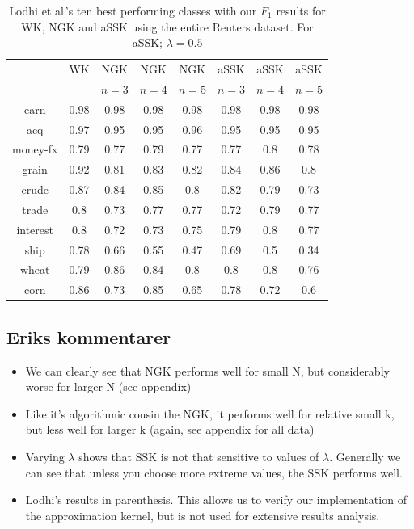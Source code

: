 \begin{table}
	\centering	
	\begin{tabular}{| c | c | c | c | c | c | c | c |}\hline
		& WK & NGK & NGK  & NGK  & aSSK & aSSK& aSSK \\ 
		&  & $n = 3$& $ n = 4 $ & $ n = 5 $ & $ n = 3 $& $ n = 4 $ & $ n = 5 $ \\ \hline
		earn & 0.98 & 0.98 &  0.98&  0.98 & 0.98 & 0.98 & 0.98 \\ \hline
		acq & 0.97 & 0.95 &  0.95 &  0.96 & 0.95 & 0.95 & 0.95 \\ \hline
		money-fx & 0.79 & 0.77 &  0.79 & 0.77 & 0.77 & 0.8 & 0.78 \\ \hline
		grain & 0.92 & 0.81 &  0.83& 0.82 & 0.84 & 0.86 & 0.8 \\ \hline
		crude & 0.87 & 0.84 &  0.85 & 0.8 & 0.82 & 0.79 & 0.73 \\ \hline
		trade & 0.8 & 0.73 &  0.77 & 0.77 & 0.72 & 0.79 & 0.77 \\ \hline
		interest & 0.8 & 0.72 &  0.73 & 0.75 & 0.79 & 0.8 & 0.77 \\ \hline
		ship & 0.78 & 0.66 &  0.55 & 0.47 & 0.69 & 0.5 & 0.34 \\ \hline
		wheat & 0.79 & 0.86 &  0.84 & 0.8 & 0.8 & 0.8 & 0.76 \\ \hline
		corn & 0.86 & 0.73 &  0.85 & 0.65 & 0.78 & 0.72 & 0.6 \\ \hline	
	\end{tabular}
\caption{Lodhi et al.'s ten best performing classes with our $ F_1 $ results for WK, NGK and  aSSK using the entire Reuters dataset. For aSSK; $ \lambda = 0.5 $\label{tab:full_data} }
\end{table}


\subsection{Eriks kommentarer}
\begin{itemize}
	\item We can clearly see that NGK performs well for small N, but considerably worse for larger N (see appendix)
	
	\item Like it's algorithmic cousin the NGK, it performs well for relative small k, but less well for larger k (again, see appendix for all data)
	
	\item  Varying $ \lambda $ shows that SSK is not that sensitive to values of $ \lambda $. Generally we can see that unless you choose more extreme values, the SSK performs well.
	
	\item Lodhi's results in parenthesis. This allows us to verify our implementation of the approximation kernel, but is not used for extensive results analysis.
\end{itemize}
